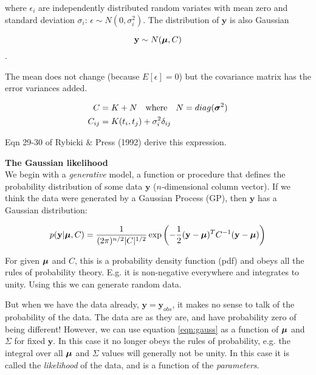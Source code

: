 \documentclass[a4paper, 11pt, amsmath, graphicx]{article}\usepackage[]{graphicx}\usepackage[]{color}
\def\bmu{{\mbox{\boldmath $\mu$}}}
\def\bs{{\mbox{\boldmath $\sigma$}}}
\begin{document}
where $\epsilon_i$ are independently distributed random variates with mean zero and standard deviation $\sigma_i$: $\epsilon \sim N(0, \sigma_i^2)$. The distribution of $\mathbf{y}$ is also Gaussian 


\begin{equation}
  \mathbf{y} \sim N(\bmu, C)
\end{equation}.

The mean does not change (because $E[\epsilon] = 0$) but the covariance matrix has the error variances added.

\begin{align}
  C & = K + N ~~~ \text{where} ~~~ N = diag(\bs^2) \nonumber \\
  C_{ij} & = K(t_i, t_j) + \sigma_i^2 \delta_{ij}
\end{align}

Eqn 29-30 of Rybicki \& Press (1992) derive this expression.

\vspace{0.4cm}
\textbf{The Gaussian likelihood}
\\

We begin with a \emph{generative} model, a function or procedure that defines the probability distribution of some data $\mathbf{y}$ ($n$-dimensional column vector). If we think the data were generated by a Gaussian Process (GP), then $\mathbf{y}$ has a  Gaussian distribution:

\begin{equation}
\label{eqn:gauss}
  p(\mathbf{y}|\bmu, C) = \frac{1}{ (2 \pi)^{n/2} |C|^{1/2} } 
                 \exp \left( -\frac{1}{2} (\mathbf{y} - \bmu)^T
                 C^{-1} (\mathbf{y} - \bmu) \right)
\end{equation}

For given $\bmu$ and $C$, this is a probability density function (pdf) and obeys all the rules of probability theory. E.g. it is non-negative everywhere and integrates to unity. Using this we can generate random data.

But when we have the data already, $\mathbf{y} = \mathbf{y}_{obs}$, it makes no sense to talk of the probability of the data. The data are as they are, and have probability zero of being different! However, we can use equation \ref{eqn:gauss} as a function of $\bmu$ and $\Sigma$ for fixed $\mathbf{y}$. In this case it no longer obeys the rules of probability, e.g. the integral over all $\bmu$ and $\Sigma$ values will generally not be unity. In this case it is called the \emph{likelihood} of the data, and is a function of the \emph{parameters}. 
\end{document}
